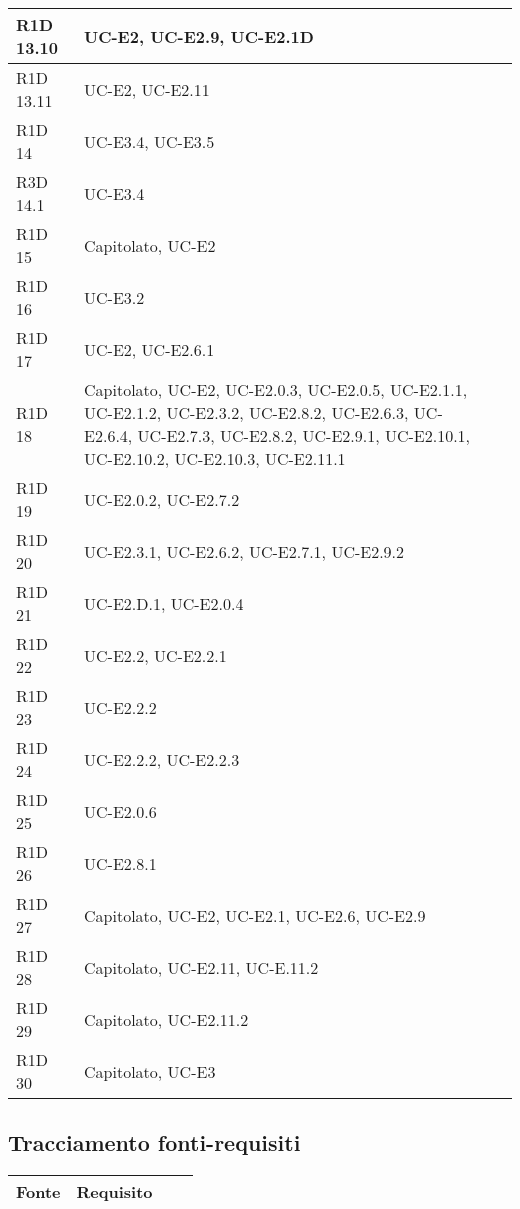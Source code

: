 \begin{center}
\begin{longtable}{ | l | p{2cm} | p{4.7cm} | p{2cm} |}
    R1D 13.10 & UC-E2, UC-E2.9, UC-E2.1D \\ \hline
    R1D 13.11 & UC-E2, UC-E2.11 \\ \hline
    R1D 14 &  UC-E3.4, UC-E3.5\\ \hline
    R3D 14.1 & UC-E3.4 \\ \hline
    R1D 15 & Capitolato, UC-E2  \\ \hline
    R1D 16 & UC-E3.2 \\ \hline
    R1D 17 & UC-E2, UC-E2.6.1 \\ \hline
    R1D 18 & Capitolato, UC-E2, UC-E2.0.3, UC-E2.0.5, UC-E2.1.1, UC-E2.1.2, UC-E2.3.2, UC-E2.8.2, UC-E2.6.3, UC-E2.6.4, UC-E2.7.3, UC-E2.8.2, UC-E2.9.1, UC-E2.10.1, UC-E2.10.2, UC-E2.10.3, UC-E2.11.1 \\ \hline
    R1D 19 & UC-E2.0.2, UC-E2.7.2 \\ \hline
    R1D 20 & UC-E2.3.1, UC-E2.6.2, UC-E2.7.1, UC-E2.9.2 \\ \hline
    R1D 21 & UC-E2.D.1, UC-E2.0.4 \\ \hline
    R1D 22 & UC-E2.2, UC-E2.2.1 \\ \hline
    R1D 23 & UC-E2.2.2 \\ \hline
    R1D 24 & UC-E2.2.2, UC-E2.2.3  \\ \hline
    R1D 25 & UC-E2.0.6  \\ \hline
    R1D 26 & UC-E2.8.1 \\ \hline
    R1D 27 & Capitolato, UC-E2, UC-E2.1, UC-E2.6, UC-E2.9 \\ \hline
    R1D 28 & Capitolato, UC-E2.11, UC-E.11.2 \\ \hline
    R1D 29 & Capitolato, UC-E2.11.2 \\ \hline
    R1D 30 & Capitolato, UC-E3 \\ \hline
    \end{longtable}
  \egroup
\end{center} 

\subsection{Tracciamento fonti-requisiti}

\begin{center}
  \bgroup
  \def\arraystretch{1.8}
  \begin{longtable}{ | l | p{2cm} | p{4.7cm} | p{2cm} |}
    \hline
    \cellcolor[gray]{0.9} \textbf{Fonte} &   
    \cellcolor[gray]{0.9} \textbf{Requisito}\\ \hline
    \end{longtable}
  \egroup
\end{center}